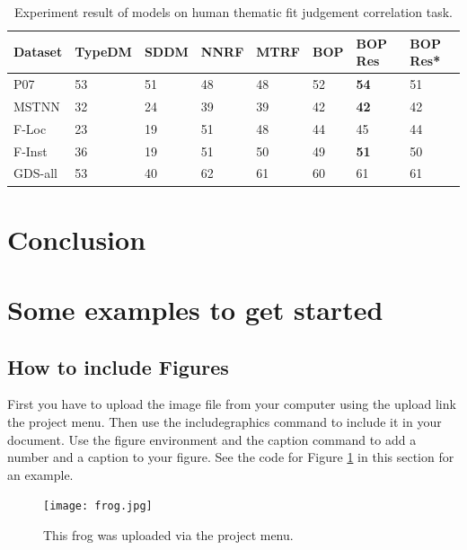 \documentclass[a4paper]{article}
\begin{document}
\begin{table}[t]
\centering
\begin{tabular}{l|l|l||l|l|l|l||l}
Dataset &   TypeDM  &   SDDM    &   NNRF    &   MTRF    &   BOP &   BOP Res     &   BOP Res*    \\ \hline
P07     &   53      &   51      &   48      &   48      &   52  &   \textbf{54} &   51          \\
MSTNN   &   32      &   24      &   39      &   39      &   42  &   \textbf{42} &   42          \\
F-Loc   &   23      &   19      &   51      &   48      &   44  &   45          &   44          \\
F-Inst  &   36      &   19      &   51      &   50      &   49  &   \textbf{51} &   50          \\
GDS-all &   53      &   40      &   62      &   61      &   60  &   61          &   61          \\
\end{tabular}
\caption{\label{tab:widgets} Experiment result of models on human thematic fit judgement correlation task.}
\end{table}






\section{Conclusion}





\newpage



\section{Some examples to get started}

\subsection{How to include Figures}

First you have to upload the image file from your computer using the upload link the project menu. Then use the includegraphics command to include it in your document. Use the figure environment and the caption command to add a number and a caption to your figure. See the code for Figure \ref{fig:frog} in this section for an example.

\begin{figure}
\centering
\texttt{[image: frog.jpg]}
\caption{\label{fig:frog}This frog was uploaded via the project menu.}
\end{figure}
\end{document}

